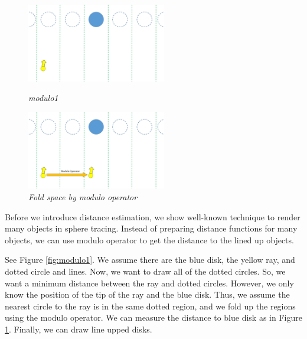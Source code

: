 \begin{figure}[htbp]
 \begin{minipage}[t]{0.5\hsize}
  \center
  \includegraphics[height=1.35in, keepaspectratio]{img/preparation/iis3d/modulo1.png}
  \caption{\textit{modulo1}}
  \label{fig:modulo1}
  \hspace*{\fill}
 \end{minipage}
 \begin{minipage}[t]{0.5\hsize}
  \center
  \includegraphics[height=1.35in, keepaspectratio]{img/preparation/iis3d/modulo2.png}
  \caption{\textit{Fold space by modulo operator}}
  \label{fig:modulo2}
  \hspace*{\fill}
 \end{minipage}
\end{figure}

Before we introduce distance estimation, we show
well-known technique to render many objects in sphere tracing.
Instead of preparing distance functions for many objects, we can use modulo operator
to get the distance to the lined up objects.

See Figure \ref{fig:modulo1}. We assume there are the blue disk, the
yellow ray, and dotted circle and lines.
Now, we want to draw all of the dotted circles.
So, we want a minimum distance between the ray and dotted circles.
However, we only know the position of the tip of the ray and the blue disk.
Thus, we assume the nearest circle to the ray is in the same dotted region, and
we fold up the regions using the modulo operator.
We can measure the distance to blue disk as in Figure \ref{fig:modulo2}.
Finally, we can draw line upped disks.

